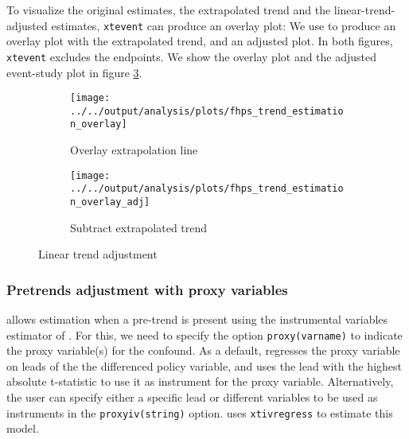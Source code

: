 \documentclass[bib]{./sty/statapress}
\begin{document}
\begin{stlog}
\nullskip
\end{stlog}

To visualize the original estimates, the extrapolated trend and the linear-trend-adjusted estimates, \texttt{xtevent} can produce an overlay plot:
We use \xteventplot to produce an overlay plot with the extrapolated trend, and an adjusted plot. In both figures, \texttt{xtevent} excludes the endpoints.
We show the overlay plot and the adjusted event-study plot in figure \ref{fig:trend}.

\begin{figure}[h!]
\centering
\begin{subfigure}{.5\textwidth}
  \centering
  \texttt{[image: ../../output/analysis/plots/fhps\_trend\_estimation\_overlay]}
  \caption{Overlay extrapolation line}
  \label{fig:overlay_trend}
\end{subfigure}%
\begin{subfigure}{.5\textwidth}
  \centering
  \texttt{[image: ../../output/analysis/plots/fhps\_trend\_estimation\_overlay\_adj]}
  \caption{Subtract extrapolated trend}
  \label{fig:subtract_trend}
\end{subfigure}
\caption{Linear trend adjustment}
\label{fig:trend}
\end{figure}

\subsubsection*{Pretrends adjustment with proxy variables}

\xtevent allows estimation when a pre-trend is present using the instrumental variables estimator of \citet{freyaldenhoven2019pre}.
For this, we need to specify the option \texttt{proxy(varname)} to indicate the proxy variable(s) for the confound.
As a default, \xtevent regresses the proxy variable on leads of the the differenced policy variable, and uses the lead with the highest absolute t-statistic to use it as instrument for the proxy variable.
Alternatively, the user can specify either a specific lead or different variables to be used as instruments in the \texttt{proxyiv(string)} option.
\xtevent uses \texttt{xtivregress} to estimate this model.

\begin{stlog}
\nullskip
\end{stlog}
\end{document}
